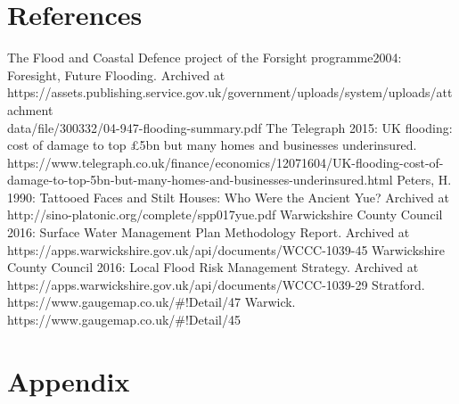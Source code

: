 \documentclass[11pt,a4paper]{article}
\begin{document}
\section{References}
\begin{thebibliography}{}
The Flood and Coastal Defence project of the Forsight programme2004: Foresight, Future Flooding. Archived at https://assets.publishing.service.gov.uk/government/uploads/system/uploads/attachment\textunderscore\\data/file/300332/04-947-flooding-summary.pdf
The Telegraph 2015: UK flooding: cost of damage to top £5bn but many homes and businesses underinsured. https://www.telegraph.co.uk/finance/economics/12071604/UK-flooding-cost-of-damage-to-top-5bn-but-many-homes-and-businesses-underinsured.html
 Peters, H. 1990: Tattooed Faces and Stilt Houses: Who Were the Ancient Yue? Archived at http://sino-platonic.org/complete/spp017\textunderscore yue.pdf
Warwickshire County Council 2016: Surface Water Management Plan Methodology Report. Archived at https://apps.warwickshire.gov.uk/api/documents/WCCC-1039-45
Warwickshire County Council 2016: Local Flood Risk Management Strategy. Archived at https://apps.warwickshire.gov.uk/api/documents/WCCC-1039-29
Stratford. https://www.gaugemap.co.uk/\#!Detail/47
Warwick. https://www.gaugemap.co.uk/\#!Detail/45
\end{thebibliography}

\newpage
\appendix
\section{Appendix}
\end{document}
